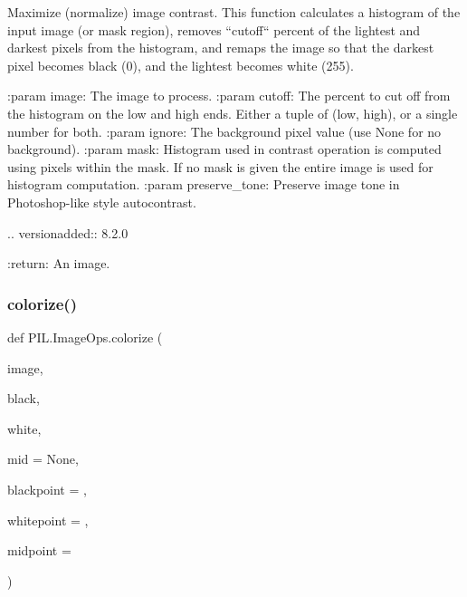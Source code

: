 \begin{DoxyVerb}Maximize (normalize) image contrast. This function calculates a
histogram of the input image (or mask region), removes ``cutoff`` percent of the
lightest and darkest pixels from the histogram, and remaps the image
so that the darkest pixel becomes black (0), and the lightest
becomes white (255).

:param image: The image to process.
:param cutoff: The percent to cut off from the histogram on the low and
               high ends. Either a tuple of (low, high), or a single
               number for both.
:param ignore: The background pixel value (use None for no background).
:param mask: Histogram used in contrast operation is computed using pixels
             within the mask. If no mask is given the entire image is used
             for histogram computation.
:param preserve_tone: Preserve image tone in Photoshop-like style autocontrast.

                      .. versionadded:: 8.2.0

:return: An image.
\end{DoxyVerb}
 \mbox{\label{namespacePIL_1_1ImageOps_af203d817228bf42ae085f1a90d65b317}} 
\subsubsection{\texorpdfstring{colorize()}{colorize()}}
{\footnotesize\ttfamily def P\+I\+L.\+Image\+Ops.\+colorize (\begin{DoxyParamCaption}\item[{}]{image,  }\item[{}]{black,  }\item[{}]{white,  }\item[{}]{mid = {\ttfamily None},  }\item[{}]{blackpoint = {},  }\item[{}]{whitepoint = {},  }\item[{}]{midpoint = {} }\end{DoxyParamCaption})}

